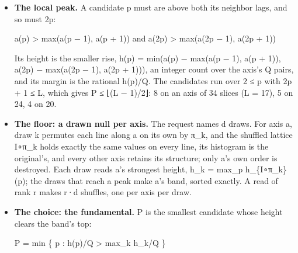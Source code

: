 \begin{itemize}
\item \textbf{The local peak.} A candidate p must are above both its neighbor lags, and so must 2p:

a(p) > max(a(p − 1), a(p + 1))  and  a(2p) > max(a(2p − 1), a(2p + 1))

Its height is the smaller rise, h(p) = min(a(p) − max(a(p − 1), a(p + 1)), a(2p) − max(a(2p − 1), a(2p + 1))), an integer count over the axis's Q pairs, and its margin is the rational h(p)/Q. The candidates run over 2 ≤ p with 2p + 1 ≤ L, which gives P ≤ ⌊(L − 1)/2⌋: 8 on an axis of 34 slices (L = 17), 5 on 24, 4 on 20.
\item \textbf{The floor: a drawn null per axis.} The request names d draws. For axis a, draw k permutes each line along a on its own by π\_\allowbreak{}k, and the shuffled lattice I∘π\_\allowbreak{}k holds exactly the same values on every line, its histogram is the original's, and every other axis retains its structure; only a's own order is destroyed. Each draw reads a's strongest height, h\_\allowbreak{}k = max\_\allowbreak{}p h\_\allowbreak{}\{I∘π\_\allowbreak{}k\}(p); the draws that reach a peak make a's band, sorted exactly. A read of rank r makes r·d shuffles, one per axis per draw.
\item \textbf{The choice: the fundamental.} P is the smallest candidate whose height clears the band's top:

P = min \{ p : h(p)/Q > max\_\allowbreak{}k h\_\allowbreak{}k/Q \}


\end{itemize}
